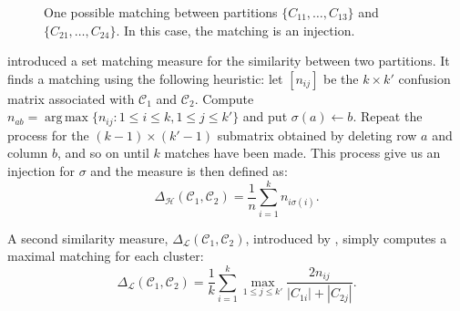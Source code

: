 \documentclass[a4paper]{report}
\DeclareMathOperator*{\argmax}{arg\,max}
\newcommand{\clus}{\mathcal{C}}
\newcommand{\partcompare}[1]{\Delta_{\mathcal{#1}}(\clus_1,\clus_2)}
\begin{document}
\begin{figure}
  \Centering
  \caption{One possible matching between partitions $\{C_{11},\dotsc,C_{13}\}$
    and $\{C_{21},\dotsc,C_{24}\}$.  In this case, the matching is an
    injection.}
  \label{fig:matching}
\end{figure}

\citet{meila-2001} introduced a set matching measure for the similarity
between two partitions.  It finds a matching using the following heuristic:
let $[n_{ij}]$ be the $k \times k'$ confusion matrix associated with $\clus_1$
and $\clus_2$.  Compute $n_{ab} = \argmax \{n_{ij} \colon 1 \leq i \leq k, 1
\leq j \leq k'\}$ and put $\sigma(a) \gets b$.  Repeat the process for the
$(k-1) \times (k'-1)$ submatrix obtained by deleting row $a$ and column $b$,
and so on until $k$ matches have been made.  This process give us an injection
for $\sigma$ and the measure is then defined as:
\begin{equation*}
  \partcompare{H} = \frac{1}{n} \sum_{i=1}^{k} n_{i \sigma(i)}.
\end{equation*}

A second similarity measure, $\partcompare{L}$, introduced by
\citet{larsen-aone-1999}, simply computes a maximal matching for each cluster:
\begin{equation*}
  \partcompare{L} = \frac{1}{k} \sum_{i=1}^{k} \max_{1 \leq j \leq k'}
                                             \frac{2n_{ij}}{|C_{1i}|+|C_{2j}|}.
\end{equation*}
\end{document}

